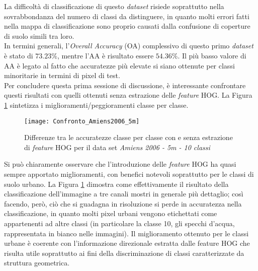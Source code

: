 La difficoltà di classificazione di questo \emph{dataset} risiede
soprattutto nella sovrabbondanza del numero di classi da distinguere,
in quanto molti errori fatti nella mappa di classificazione sono
proprio causati dalla confusione di coperture di suolo simili tra
loro.\\

In termini generali, l'\emph{Overall Accuracy} (OA) complessivo di
questo primo \emph{dataset} è stato di $73.23\%$, mentre l'AA è
risultato essere $54.36\%$. Il più basso valore di AA è legato al
fatto che accuratezze più elevate si siano ottenute per classi
minoritarie in termini di pixel di test.\\

Per concludere questa prima sessione di discussione, è interessante
confrontare questi risultati con quelli ottenuti senza estrazione
delle \emph{feature} HOG. La Figura \ref{fig:Confronto_Amiens2006_5m}
sintetizza i miglioramenti/peggioramenti classe per classe.

\begin{figure}[!ht]

\texttt{[image: Confronto\_Amiens2006\_5m]}

\caption{Differenze tra le accuratezze classe per classe con e
senza estrazione di \emph{feature} HOG per il data set \emph{Amiens 2006 - 5m - 10 classi}}

\label{fig:Confronto_Amiens2006_5m}

\end{figure}

Si può chiaramente osservare che l'introduzione delle \emph{feature}
HOG ha quasi sempre apportato miglioramenti, con benefici notevoli
soprattutto per le classi di suolo urbano. La Figura
\ref{fig:Confronto_Amiens2006_5m} dimostra come effettivamente il
risultato della classificazione dell'immagine a tre canali mostri in
generale più dettaglio; così facendo, però, ciò che si guadagna in
risoluzione si perde in accuratezza nella classificazione, in quanto
molti pixel urbani vengono etichettati come appartenenti ad altre
classi (in particolare la classe 10, gli specchi d'acqua,
rappresentata in bianco nelle immagini). Il miglioramento ottenuto per
le classi urbane è coerente con l'informazione direzionale estratta
dalle feature HOG che risulta utile soprattutto ai fini della
discriminazione di classi caratterizzate da struttura geometrica.

